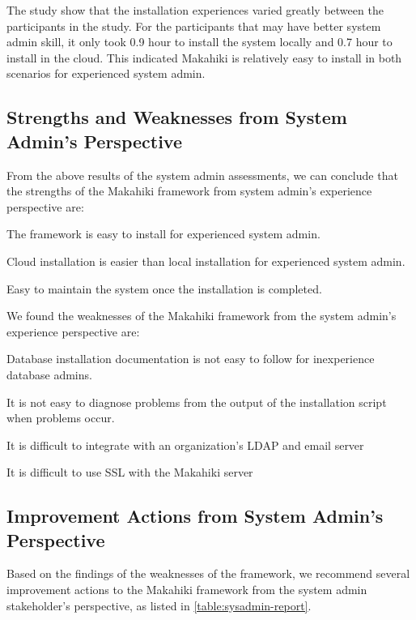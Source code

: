 The study show that the installation experiences varied greatly between the participants in the study. For the participants that may have better system admin skill, it only took 0.9 hour to install the system locally and 0.7 hour to install in the cloud. This indicated Makahiki is relatively easy to install in both scenarios for experienced system admin.

\subsection{Strengths and Weaknesses from System Admin's Perspective}

From the above results of the system admin assessments, we can conclude that the strengths of the Makahiki framework from system admin's experience perspective are:
    \begin{compactenum}
    \item The framework is easy to install for experienced system admin.
    \item Cloud installation is easier than local installation for experienced system admin.
    \item Easy to maintain the system once the installation is completed.
    \end{compactenum}               
    
We found the weaknesses of the Makahiki framework from the system admin's experience perspective are:
    \begin{compactenum}
    \item Database installation documentation is not easy to follow for inexperience database admins.
    \item It is not easy to diagnose problems from the output of the installation script when problems occur.
    \item It is difficult to integrate with an organization's LDAP and email server
    \item It is difficult to use SSL with the Makahiki server
    \end{compactenum} 

\subsection{Improvement Actions from System Admin's Perspective}

Based on the findings of the weaknesses of the framework, we recommend several improvement actions to the Makahiki framework from the system admin stakeholder's perspective, as listed in \autoref{table:sysadmin-report}.

